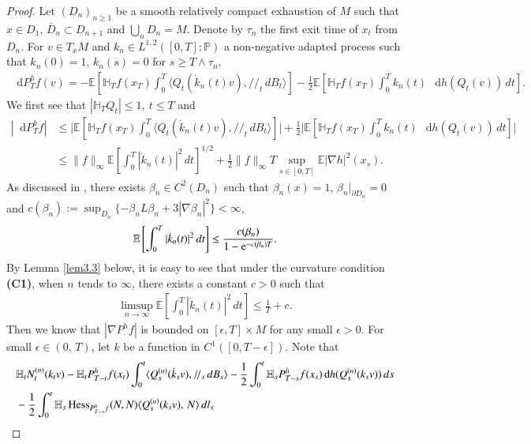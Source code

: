 \documentclass[11pt,twoside, reqno]{article}
\newcommand{\ed}{\mathop{}\!\mathrm{d}}
\def\r{\right}
\def\l{\left}
\def\e{{\rm e}}
\def\mathpal#1{\mathop{\mathchoice{\text{\rm #1}}%
   {\text{\rm #1}}{\text{\rm #1}}%
   {\text{\rm #1}}}\nolimits}
\newcommand\Hess{\mathpal{Hess}}
\newcommand\1{\mathbbm{1}}
\newcommand\E{\mathbb{E}}
\theoremstyle{definition}
\numberwithin{equation}{section}
\def \e{{\rm e}}
\begin{document}
\begin{proof}
 Let $(D_n)_{n\ge1}$ be a smooth relatively compact exhaustion of $M$ such that $x\in D_1$, $\overline D_n\subset D_{n+1}$ and $\bigcup_nD_n=M$. Denote by $\tau_n$ the first exit time of $x_t$ from $D_n$.  
For $v\in T_{x} M$ and $k_n\in L^{1,2}([0,T];\mathbb{P})$  a non-negative adapted process  such that $k_n(0)=1$, $k_n(s)=0$ for $s\geq T\wedge \tau_{n}$,
\begin{align}\label{Bismut-F}
    \ed P_T^h f(v)= -\E\l[ \mathbb{H}_T f(x_T)\int_0^{T} \langle Q_t(\dot{k}_n(t)v), /\!/ _t \,dB_t\rangle\r]
    -\frac{1}{2}\E\l[\mathbb{H}_T f(x_T)\int_0^{T} k_n(t) \, \ed h (Q_t(v))\, dt \r]. 
\end{align} 
We first see that  \(|\mathbb{H}_T Q_t |\leq 1,\ t\leq T\) 
and
\begin{align*}
    |\ed P_T^h f|&\leq \Big|\E\l[ \mathbb{H}_T f(x_T)\int_0^{T} \langle Q_t(\dot{k}_n(t)v), /\!/ _t \,dB_t\rangle\r]\Big|+
   \frac{1}{2} \Big|\E\l[\mathbb{H}_T f(x_T)\int_0^{T} k_n(t) \, \ed h (Q_t(v))\, dt \r]\Big|\\
   &\leq \|f\|_{\infty} \E\l[\int_0^{T}|\dot{k}_n(t)|^2 \,d t\r]^{1/2}+\frac{1}{2}\|f\|_{\infty} T \sup_{s\in [0,T]}\E |\nabla h|^2(x_s).
\end{align*} 
As discussed in \cite{TW98}, there exists $\beta_n \in C^2(D_n)$ such that $\beta_n(x)=1$, $\beta_n|_{\partial D_n}=0$ and $c(\beta_n):=\sup_{D_n}\{- \beta_nL\beta_n+3 |\nabla \beta_n|^2\}<\infty$,
\begin{align}\label{beta-n}
\E\l[\int_0^{T}|\dot{k}_n(t)|^2 \,d t\r]\leq \frac{c(\beta_n)}{1-\e^{-c(\beta_n)T}}.
\end{align}
By Lemma \ref{lem3.3} below, it is easy to see that  under the curvature condition {\bf (C1)}, when $n$ tends to $\infty$, there
exists a constant $c>0$ such that
\begin{align*}
\limsup_{n\rightarrow \infty}\E\l[\int_0^{T}|\dot{k}_n(t)|^2 \,d t\r]\leq \frac{1}{T}+c.
\end{align*}
 Then  we  know that
$|\nabla P_{\cdot}^hf|$ is bounded on $[\epsilon, T] \times M$ for any small $\epsilon>0$.  For small $\epsilon\in (0,\,T)$, let $k$ be a function
in $C^1([0,T-\epsilon])$. 
Note that 
\begin{align*}
   &\mathbb{H}_t N_t^{(n)}(k_t v) - \mathbb{H}_t P_{T-t}^hf(x_t) \int_0^t \langle Q_s^{(n)}(\dot{k}_s v), /\!/_s \,dB_s \rangle  - \frac{1}{2}\int_0^t \mathbb{H}_s P_{T-s}^h f(x_s) \ed h(Q_s^{(n)}(k_s v)) \,ds 
   \\
   &-\frac{1}{2} \int_0^t \mathbb{H}_s \Hess_{P_{T-s}^hf}(N,N)\langle Q_s^{(n)}(k_sv),\, N \rangle \, dl_s

\end{align*}
\end{proof}
\end{document}
